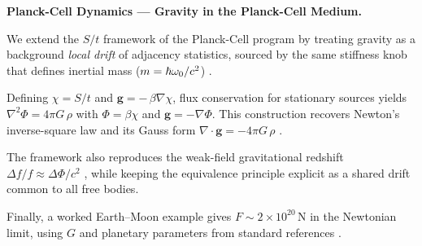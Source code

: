 
\noindent \textbf{Planck-Cell Dynamics — Gravity in the Planck-Cell Medium.}

We extend the $S/t$ framework of the Planck-Cell program by treating gravity as a background
\emph{local drift} of adjacency statistics, sourced by the same stiffness knob that defines inertial
mass ($m=\hbar\omega_0/c^2$) \cite{langstaff2025_temporal_relativity_entropy_clock,langstaff2025_planck_cell_kinematics,langstaff2025_planck_cell_mass}.

Defining $\chi=S/t$ and $\mathbf g=-\,\beta\nabla\chi$, flux conservation for stationary sources yields
$\nabla^2\Phi=4\pi G\,\rho$ with $\Phi=\beta\chi$ and $\mathbf g=-\nabla\Phi$. This construction recovers Newton’s
inverse-square law and its Gauss form $\nabla\!\cdot\!\mathbf g=-4\pi G\,\rho$ \cite{newton1687principia}.

The framework also reproduces the weak-field gravitational redshift
$\Delta f/f\approx\Delta\Phi/c^2$ \cite{einstein1916foundation,will2014confrontation}, while keeping the equivalence
principle explicit as a shared drift common to all free bodies.

Finally, a worked Earth–Moon example gives
$F\!\sim\!2\times10^{20}\,\mathrm N$ in the Newtonian limit, using $G$ and planetary parameters from
standard references \cite{codata2018,nasa_earth_fact,nasa_moon_fact}.
